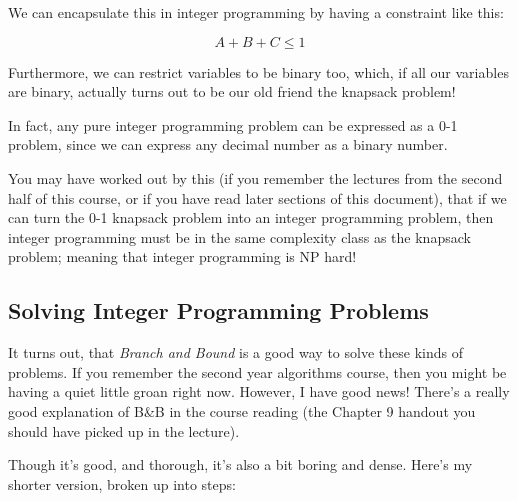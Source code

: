 We can encapsulate this in integer programming by having a constraint like this:

\[
  A + B + C \leq 1
\]

Furthermore, we can restrict variables to be binary too, which, if all our
variables are binary, actually turns out to be our old friend the knapsack
problem!

In fact, any pure integer programming problem can be expressed as a 0-1 problem,
since we can express any decimal number as a binary number.


You may have worked out by this (if you remember the lectures from the second
half of this course, or if you have read later sections of this document), that
if we can turn the 0-1 knapsack problem into an integer programming problem,
then integer programming must be in the same complexity class as the knapsack
problem; meaning that integer programming is NP hard!

\subsection{Solving Integer Programming Problems}

It turns out, that \textit{Branch and Bound} is a good way to solve these kinds
of problems. If you remember the second year algorithms course, then you might
be having a quiet little groan right now. However, I have good news! There's a
really good explanation of B\&B in the course reading (the Chapter 9 handout you
should have picked up in the lecture).

Though it's good, and thorough, it's also a bit boring and dense. Here's my
shorter version, broken up into steps:

